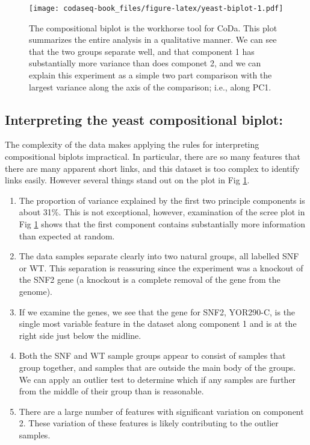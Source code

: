 \documentclass[
  onecolumn]{article}
\providecommand{\tightlist}{%
  \setlength{\itemsep}{0pt}\setlength{\parskip}{0pt}}
\begin{document}
\begin{figure}
\centering
\texttt{[image: codaseq-book\_files/figure-latex/yeast-biplot-1.pdf]}
\caption{\label{fig:yeast-biplot}The compositional biplot is the workhorse tool for CoDa. This plot summarizes the entire analysis in a qualitative manner. We can see that the two groups separate well, and that component 1 has substantially more variance than does componet 2, and we can explain this experiment as a simple two part comparison with the largest variance along the axis of the comparison; i.e., along PC1.}
\end{figure}

\hypertarget{interpreting-the-yeast-compositional-biplot}{%
\subsection{Interpreting the yeast compositional biplot:}\label{interpreting-the-yeast-compositional-biplot}}

The complexity of the data makes applying the rules for interpreting compositional biplots impractical. In particular, there are so many features that there are many apparent short links, and this dataset is too complex to identify links easily. However several things stand out on the plot in Fig \ref{fig:yeast-biplot}.

\begin{enumerate}
\def\labelenumi{\arabic{enumi})}
\tightlist
\item
  The proportion of variance explained by the first two principle components is about 31\%. This is not exceptional, however, examination of the scree plot in Fig \ref{fig:yeast-biplot} shows that the first component contains substantially more information than expected at random.
\item
  The data samples separate clearly into two natural groups, all labelled SNF or WT. This separation is reassuring since the experiment was a knockout of the SNF2 gene (a knockout is a complete removal of the gene from the genome).
\item
  If we examine the genes, we see that the gene for SNF2, YOR290-C, is the single most variable feature in the dataset along component 1 and is at the right side just below the midline.
\item
  Both the SNF and WT sample groups appear to consist of samples that group together, and samples that are outside the main body of the groups. We can apply an outlier test to determine which if any samples are further from the middle of their group than is reasonable.
\item
  There are a large number of features with significant variation on component 2. These variation of these features is likely contributing to the outlier samples.
\end{enumerate}
\end{document}
